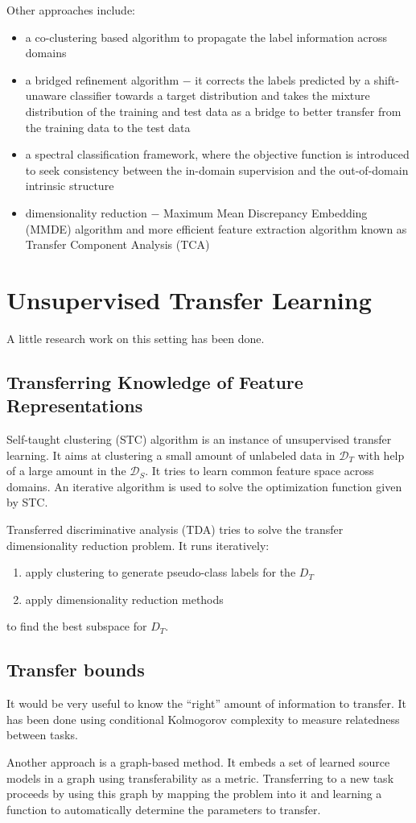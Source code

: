 \documentclass[a4paper,twocolumn]{article}
\newcommand{\D}{\mathcal{D}}
\begin{document}
Other approaches include:
\begin{itemize}
    \item a co-clustering based algorithm to propagate the label information across domains
    \item a bridged refinement algorithm $-$ it corrects the labels predicted by a shift-unaware classifier towards a target distribution and takes the mixture distribution of the training and test data as a bridge to better transfer from the training data to the test data
    \item a spectral classification framework, where the objective function is introduced to seek consistency between the in-domain supervision and the out-of-domain intrinsic structure
    \item dimensionality reduction $-$ Maximum Mean Discrepancy Embedding (MMDE) algorithm and more efficient feature extraction algorithm known as Transfer Component Analysis (TCA)
\end{itemize}

\section{Unsupervised Transfer Learning}
A little research work on this setting has been done.

\subsection{Transferring Knowledge of Feature Representations}
Self-taught clustering (STC) algorithm is an instance of unsupervised transfer learning. It aims at clustering a small amount of unlabeled data in $\D_T$ with help of a large amount in the $\D_S$. It tries to learn common feature space across domains. An iterative algorithm is used to solve the optimization function given by STC.

Transferred discriminative analysis (TDA) tries to solve the transfer dimensionality reduction problem. It runs iteratively:
\begin{enumerate}
    \item apply clustering to generate pseudo-class labels for the $D_T$
    \item apply dimensionality reduction methods
\end{enumerate}
to find the best subspace for $D_T$.

\subsection*{Transfer bounds}
It would be very useful to know the ``right'' amount of information to transfer. It has been done using conditional Kolmogorov complexity to measure relatedness between tasks.

Another approach is a graph-based method. It embeds a set of learned source models in a graph using transferability as a metric. Transferring to a new task proceeds by using this graph by mapping the problem into it and learning a function to automatically determine the parameters to transfer.
\end{document}
